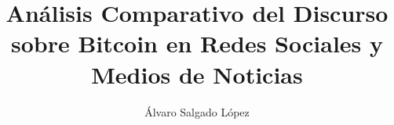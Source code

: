 \documentclass[journal]{IEEEtran}
\begin{document}
%
\title{Análisis Comparativo del Discurso sobre Bitcoin en Redes Sociales y Medios de Noticias}


\author{Álvaro Salgado López}

% 
%














\maketitle
\end{document}
